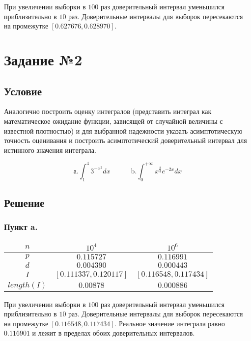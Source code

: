 \documentclass[a4paper,fontsize=13pt]{article}
\begin{document}
При увеличении выборки в $100$ раз доверительный интервал уменьшился приблизительно в $10$ раз. Доверительные интервалы для выборок пересекаются на промежутке $[0.627676, 0.628970]$. 

\section*{Задание №2}

\subsection*{Условие}

Аналогично построить оценку интегралов (представить интеграл как математическое ожидание функции, зависящей от случайной величины с известной плотностью) и для выбранной надежности указать асимптотическую точность оценивания и построить асимптотический доверительный интервал для истинного значения интеграла.

$$\text{а.} \int_{1}^{4} 3^{-x^2} dx \quad\quad\quad \text{b.} \int_{0}^{+\infty} x^{\frac{2}{3}} e^{-2x} dx$$

\subsection*{Решение}

\subsubsection*{Пункт a.}


\begin{center}
\begin{tabular}{| c | c | c |}
\hline
 $n$ & $10^4$ & $10^6$ \\ 
 \hline
 $p$ & $0.115727$ & $0.116991$ \\  
 \hline
 $d$ & $0.004390$ & $0.000443$ \\  
 \hline
 $I$ & $[0.111337, 0.120117]$ & $[0.116548, 0.117434]$ \\
 \hline
 $length(I)$ & $0.00878$ & $0.000886$ \\
 \hline
\end{tabular}
\end{center}

При увеличении выборки в $100$ раз доверительный интервал уменьшился приблизительно в $10$ раз. Доверительные интервалы для выборок пересекаются на промежутке $[0.116548, 0.117434]$. Реальное значение интеграла равно $0.116901$ и лежит в пределах обоих доверительных интервалов.
\end{document}
